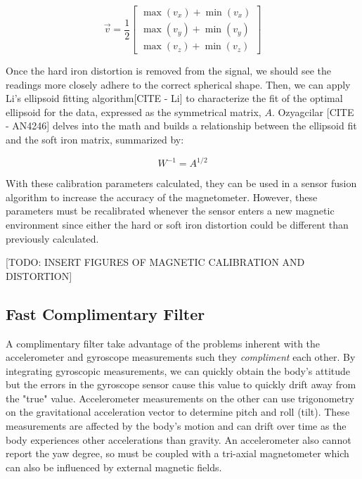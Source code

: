 \begin{equation*}
    \vec{v}=\frac{1}{2}
    \begin{bmatrix}
        \max(v_x)+\min(v_x) \\
        \max(v_y)+\min(v_y) \\
        \max(v_z)+\min(v_z)
    \end{bmatrix}
\end{equation*}

Once the hard iron distortion is removed from the signal, we should see the readings more closely adhere to the correct spherical shape. 
Then, we can apply Li’s ellipsoid fitting algorithm[CITE - Li] to characterize the fit of the optimal ellipsoid for the data, expressed as the symmetrical matrix, $A$. 
Ozyagcilar [CITE - AN4246] delves into the math and builds a relationship between the ellipsoid fit and the soft iron matrix, summarized by:

\begin{equation*}
    W^{-1}=A^{1/2}
\end{equation*}

With these calibration parameters calculated, they can be used in a sensor fusion algorithm to increase the accuracy of the magnetometer. 
However, these parameters must be recalibrated whenever the sensor enters a new magnetic environment since either the hard or soft iron distortion could be different than previously calculated.

[TODO: INSERT FIGURES OF MAGNETIC CALIBRATION AND DISTORTION]

\subsection{Fast Complimentary Filter} \label{ssec:complimentary_filter}
A complimentary filter take advantage of the problems inherent with the accelerometer and gyroscope measurements such they \textit{compliment} each other.
By integrating gyroscopic measurements, we can quickly obtain the body's attitude but the errors in the gyroscope sensor cause this value to quickly drift away from the "true" value.
Accelerometer measurements on the other can use trigonometry on the gravitational acceleration vector to determine pitch and roll (tilt).
These measurements are affected by the body's motion and can drift over time as the body experiences other accelerations than gravity.
An accelerometer also cannot report the yaw degree, so must be coupled with a tri-axial magnetometer which can also be influenced by external magnetic fields.

